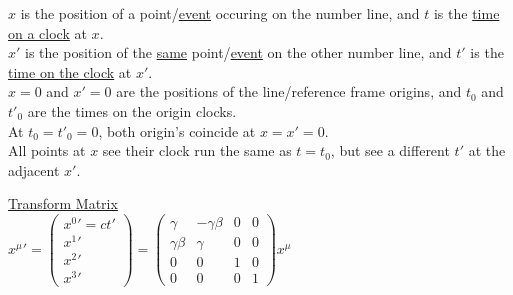 \documentclass[12pt]{article}
\begin{document}
\vspace{15pt}\noindent
\begin{minipage}[t]{.46\textwidth}
	\scriptsize
	\(x\) is the position of a point/\underline{event} occuring on the number line, and 
	\(t\) is the \underline{time on a clock} at \(x\).\\[5pt]
	\(x'\) is the position of the \underline{same} point/\underline{event} on the other number line, and
	\(t'\) is the \underline{time on the clock} at \(x'\).\\[5pt]
	\(x=0\) and \(x'=0\) are the positions of the line/reference frame origins, and 
	\(t_0\) and \(t'_0\) are the times on the origin clocks.\\[5pt]
	At \(t_0 = t'_0 = 0\), both origin's coincide at \(x=x'=0\).\\[5pt]
	All points at \(x\) see their clock run the same as \(t = t_0\), but see a different \(t'\) at the adjacent \(x'\).
\end{minipage}
\hfill
\begin{minipage}[t]{.49\textwidth}
	\setlength{\parindent}{.5cm}
	\noindent
	\underline{Transform Matrix}\\[10pt]
	\indent\({x^\mu}' = 
		\left( \begin{matrix}
			{x^0}' = ct'\\
			{x^1}'\\
			{x^2}'\\
			{x^3}'
		\end{matrix} \right) =
		\left(\begin{matrix} 
			\gamma & -\gamma\beta 	& 0 & 0\\
			\gamma\beta & \gamma 	& 0 & 0\\
			0 & 0 & 1 & 0\\
			0 & 0 & 0 & 1
		\end{matrix}\right) x^\mu\)
\end{minipage}
\end{document}
